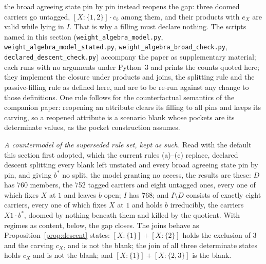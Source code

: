 the broad agreeing state pin by pin instead reopens the gap: three doomed carriers go untagged, $[X : \{1, 2\}] \cdot c_b$ among them, and their products with $e_X$ are valid while lying in $I$. That is why a filling must declare nothing. The scripts named in this section (\texttt{weight\_algebra\_model.py}, \texttt{weight\_algebra\_model\_stated.py}, \texttt{weight\_algebra\_broad\_check.py}, \texttt{declared\_descent\_check.py}) accompany the paper as supplementary material; each runs with no arguments under Python~3 and prints the counts quoted here; they implement the closure under products and joins, the splitting rule and the passive-filling rule as defined here, and are to be re-run against any change to those definitions. One rule follows for the counterfactual semantics of the companion paper: reopening an attribute clears its filling to all pins and keeps its carving, so a reopened attribute is a scenario blank whose pockets are its determinate values, as the pocket construction assumes.

\textit{A countermodel of the superseded rule set, kept as such.} Read with the default this section first adopted, which the current rules (a)--(c) replace, declared descent splitting every blank left unstated and every broad agreeing state pin by pin, and giving $b^{\ast}$ no split, the model granting no access, the results are these: $D$ has 760 members, the 752 tagged carriers and eight untagged ones, every one of which fixes $X$ at $1$ and leaves $b$ open; $I$ has 768; and $I \setminus D$ consists of exactly eight carriers, every one of which fixes $X$ at $1$ and holds $b$ irreducibly, the carriers $X1 \cdot b^{\ast}$, doomed by nothing beneath them and killed by the quotient. With regimes as content, below, the gap closes. The joins behave as Proposition~\ref{prop:descent} states: $[X : \{1\}] + [X : \{2\}]$ holds the exclusion of $3$ and the carving $c_X$, and is not the blank; the join of all three determinate states holds $c_X$ and is not the blank; and $[X : \{1\}] + [X : \{2, 3\}]$ is the blank.

\printbibliography
